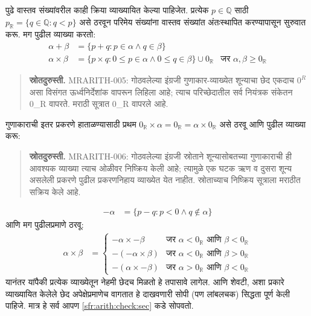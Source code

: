 \documentclass[11pt,a4paper,openany]{book}
\theoremstyle{definition}
\newcommand{\Setabs}[2]{\{#1:#2\}}
\newcommand{\Rat}{\mathbb{Q}}
\newcommand{\Real}{\mathbb{R}}
\newcommand{\defis}{=}
\begin{document}
पुढे वास्तव संख्यांवरील काही क्रिया व्याख्यायित केल्या पाहिजेत. प्रत्येक
$p \in \Rat$ साठी $p_\Real = \Setabs{q \in \Rat}{q < p}$ असे ठरवून
परिमेय संख्यांना वास्तव संख्यांत अंतःस्थापित करण्यापासून सुरुवात करू.
मग पुढील व्याख्या करतो:
\begin{align*}
	\alpha + \beta &= \Setabs{p + q}{p \in \alpha \land q \in \beta}\\
	\alpha \times \beta &=
	\Setabs{p \times q}{0 \leq p \in \alpha \land 0 \leq q \in \beta} \cup 0_\Real & \text{जर }\alpha, \beta \geq 0_\Real
\end{align*}
\begin{quote}\small\textbf{स्रोतदुरुस्ती.} MRARITH-005: गोठवलेल्या इंग्रजी गुणाकार-व्याख्येत शून्याचा छेद एकदाच $0^R$ असा विसंगत ऊर्ध्वनिर्देशांक वापरून लिहिला आहे; त्याच परिच्छेदातील सर्व नियंत्रक संकेतन 0\_R वापरते. मराठी सूत्रात 0\_R वापरले आहे.\end{quote}
गुणाकाराची इतर प्रकरणे हाताळण्यासाठी प्रथम $0_\Real \times \alpha = 0_\Real = \alpha \times 0_\Real$ असे ठरवू आणि पुढील व्याख्या करू:
\begin{quote}\small\textbf{स्रोतदुरुस्ती.} MRARITH-006: गोठवलेल्या इंग्रजी स्रोताने शून्यासोबतच्या गुणाकाराची ही आवश्यक व्याख्या त्याच ओळीवर निष्क्रिय केली आहे; त्यामुळे एक घटक ऋण व दुसरा शून्य असलेली प्रकरणे पुढील प्रकरणनिहाय व्याख्येत येत नाहीत. स्रोताच्याच निष्क्रिय सूत्राला मराठीत सक्रिय केले आहे.\end{quote}
\begin{align*}
	-\alpha &= \Setabs{p - q}{p < 0 \land q \notin \alpha}
\end{align*}
आणि मग पुढीलप्रमाणे ठरवू:
\begin{align*}
	\alpha \times \beta &\defis
	\begin{cases}
		\mathord{-}\alpha \times \mathord{-}\beta &\text{जर }\alpha < 0_\Real\text{ आणि }\beta < 0_\Real\\
		\mathord{-}(\mathord{-}\alpha \times \beta) &\text{जर }\alpha < 0_\Real \text{ आणि }\beta > 0_\Real\\
		\mathord{-}(\alpha \times \mathord{-}\beta) &\text{जर }\alpha > 0_\Real \text{ आणि }\beta < 0_\Real
	\end{cases}
\end{align*}
यानंतर यांपैकी प्रत्येक व्याख्येतून नेहमी छेदच मिळतो हे तपासावे लागेल.
आणि शेवटी, अशा प्रकारे व्याख्यायित केलेले छेद अपेक्षेप्रमाणेच वागतात
हे दाखवणारी सोपी (पण लांबलचक) सिद्धता पूर्ण केली पाहिजे. मात्र हे सर्व
आपण \ref{sfr:arith:check:sec} कडे सोपवतो.
\end{document}

